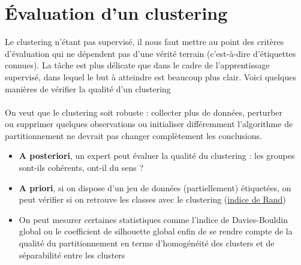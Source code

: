 \documentclass[10pt]{beamer}
\newcommand{\ex}{{\color{MPTblue}\ding{228}}}
\begin{document}
\section{Évaluation d'un clustering}


\begin{frame}
	

	  Le clustering n’étant pas supervisé, il nous faut mettre au point des critères d’évaluation qui ne dépendent pas d’une vérité terrain (c’est-à-dire d’étiquettes connues). La tâche est plus délicate que dans
	le cadre de l’apprentissage supervisé, dans lequel le but à atteindre est beaucoup plus clair. Voici quelques manières de vérifier la qualité d'un clustering\\
	
	
	\vspace*{1em}
	\\[0.2em]
	On veut que le clustering soit robuste : collecter plus de
	données, perturber\\ ou supprimer quelques observations ou initialiser différemment l'algorithme de partitionnement ne devrait pas changer complètement les conclusions.\\[1em] 	
	\begin{itemize}
		\item[\ex] \textbf{A posteriori}, un expert peut évaluer la qualité du clustering : les groupes sont-ils cohérents, ont-il du sens ?\\[0.2em]
		\item[\ex] \textbf{A priori}, si on dispose d'un jeu de données (partiellement) étiquetées, on peut vérifier si on retrouve les classes avec le clustering (\href{https://fr.wikipedia.org/wiki/Indice_de_Rand}{indice de Rand})
	\end{itemize}

	\vspace*{1em}
\begin{itemize}
	\item[\ex] On peut mesurer certaines statistiques comme l'indice de Davies-Bouldin global ou le coefficient de silhouette global enfin de se rendre compte de la qualité du partitionnement en terme d'homogénéité des clusters et de séparabilité entre les clusters
\end{itemize}
	
	
\end{frame}
\end{document}
